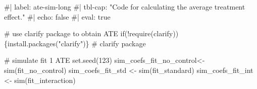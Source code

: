 \documentclass[
  singlecolumn]{article}
\newenvironment{Shaded}{}{}
\newcommand{\CommentTok}[1]{\textcolor[rgb]{0.42,0.45,0.49}{#1}}
\newcommand{\ControlFlowTok}[1]{\textcolor[rgb]{0.84,0.23,0.29}{#1}}
\newcommand{\DecValTok}[1]{\textcolor[rgb]{0.00,0.36,0.77}{#1}}
\newcommand{\FunctionTok}[1]{\textcolor[rgb]{0.44,0.26,0.76}{#1}}
\newcommand{\NormalTok}[1]{\textcolor[rgb]{0.14,0.16,0.18}{#1}}
\newcommand{\OtherTok}[1]{\textcolor[rgb]{0.44,0.26,0.76}{#1}}
\newcommand{\SpecialCharTok}[1]{\textcolor[rgb]{0.00,0.36,0.77}{#1}}
\newcommand{\StringTok}[1]{\textcolor[rgb]{0.01,0.18,0.38}{#1}}
\begin{document}
\begin{Shaded}
\begin{Highlighting}[]
\CommentTok{\#| label: ate{-}sim{-}long}
\CommentTok{\#| tbl{-}cap: "Code for calculating the average treatment effect."}
\CommentTok{\#| echo: false}
\CommentTok{\#| eval: true}

\CommentTok{\# use \textasciigrave{}clarify\textasciigrave{} package to obtain ATE}
\ControlFlowTok{if}\NormalTok{(}\SpecialCharTok{!}\FunctionTok{require}\NormalTok{(clarify))\{}\FunctionTok{install.packages}\NormalTok{(}\StringTok{"clarify"}\NormalTok{)\} }\CommentTok{\# clarify package}

\CommentTok{\# simulate fit 1 ATE}
\FunctionTok{set.seed}\NormalTok{(}\DecValTok{123}\NormalTok{)}
\NormalTok{sim\_coefs\_fit\_no\_control}\OtherTok{\textless{}{-}} \FunctionTok{sim}\NormalTok{(fit\_no\_control)  }
\NormalTok{sim\_coefs\_fit\_std }\OtherTok{\textless{}{-}} \FunctionTok{sim}\NormalTok{(fit\_standard)}
\NormalTok{sim\_coefs\_fit\_int }\OtherTok{\textless{}{-}} \FunctionTok{sim}\NormalTok{(fit\_interaction)}


\end{Highlighting}
\end{Shaded}
\end{document}
